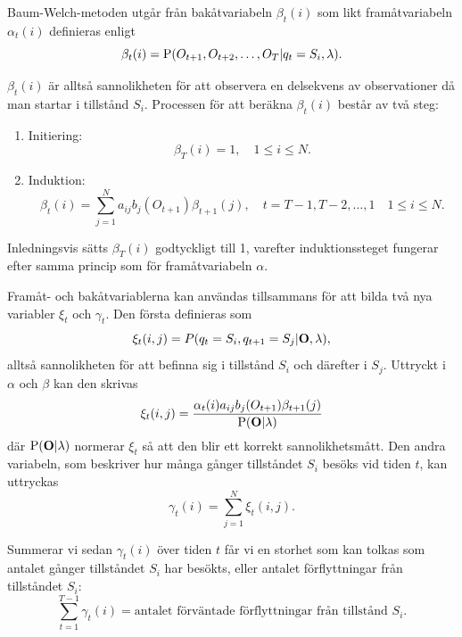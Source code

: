 \documentclass[../rapport_MVEX01-11-05]{subfiles}
\begin{document}
Baum-Welch-metoden utgår från bakåtvariabeln $\beta_t(i)$ som likt
framåtvariabeln $\alpha_t(i)$ definieras enligt
\begin{equation*}
\beta_t(i) = \mathrm{P}(O_{t+1},O_{t+2},\dots,O_T | q_t = S_i, \lambda).
\end{equation*} 

$\beta_t(i)$ är alltså sannolikheten för att observera en delsekvens av
observationer då man startar i tillstånd $S_i$. Processen för att beräkna $\beta_t(i)$ består av två steg:
\begin{enumerate}
\item Initiering: 
\begin{equation*}
\beta_T(i) = 1, \quad 1 \leq i \leq N.
\end{equation*}
\item Induktion: 
\begin{equation*}
\beta_t(i) = \sum\limits_{j=1}^Na_{ij}b_j(O_{t+1})\beta_{t+1}(j), \quad t =
T-1,T-2,\dots,1 \quad 1 \leq i \leq N.
\end{equation*}
\end{enumerate}

Inledningsvis sätts $\beta_T(i)$ godtyckligt till 1, varefter
induktionssteget fungerar efter samma princip som för framåtvariabeln
$\alpha$.

Framåt- och bakåtvariablerna kan användas tillsammans
för att bilda två nya variabler $\xi_t$ och $\gamma_t$.
Den första definieras som 
\begin{equation*}
\xi_t(i,j) = P(q_t = S_i, q_{t+1} = S_j|\mathbf{O},\lambda),
\end{equation*}
alltså sannolikheten för att befinna sig i tillstånd $S_i$ och
därefter i $S_j$. Uttryckt i $\alpha$ och $\beta$ kan den skrivas
\begin{equation*}
\xi_t(i,j) = \frac{\alpha_t(i)a_{ij}b_j(O_{t+1})\beta_{t+1}(j)}{\mathrm{P}(\mathbf{O}|\lambda)}
\end{equation*} 
där $\mathrm{P}(\mathbf{O}|\lambda)$ normerar $\xi_t$ så att den blir ett korrekt
sannolikhetsmått.
Den andra variabeln, som beskriver hur många gånger tillståndet $S_i$ besöks
vid tiden $t$, kan uttryckas
\begin{equation*}
\gamma_t(i) = \sum_{j=1}^N\xi_t(i,j).
\end{equation*}

Summerar vi sedan $\gamma_t(i)$ över tiden $t$ får vi en storhet
som kan tolkas som antalet gånger tillståndet $S_i$ har besökts,
eller antalet förflyttningar från tillståndet $S_i$:
\begin{equation*}
\sum_{t=1}^{T-1}\gamma_t(i) = \text{antalet förväntade förflyttningar
  från tillstånd $S_i$.}
\end{equation*} 
\end{document}

